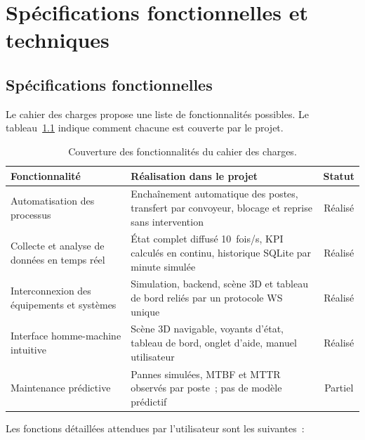 \chapter{Spécifications fonctionnelles et techniques}
\label{chap:specs}

\section{Spécifications fonctionnelles}

Le cahier des charges propose une liste de fonctionnalités possibles. Le tableau~\ref{tab:fonctionnel} indique comment chacune est couverte par le projet.

\begin{table}[H]
\centering
\caption{Couverture des fonctionnalités du cahier des charges.}
\label{tab:fonctionnel}
\begin{tabularx}{\textwidth}{@{}p{4.2cm} X c@{}}
\toprule
\textbf{Fonctionnalité} & \textbf{Réalisation dans le projet} & \textbf{Statut} \\
\midrule
Automatisation des processus & Enchaînement automatique des postes, transfert par convoyeur, blocage et reprise sans intervention & Réalisé \\
Collecte et analyse de données en temps réel & État complet diffusé 10~fois/s, \ac{KPI} calculés en continu, historique SQLite par minute simulée & Réalisé \\
Interconnexion des équipements et systèmes & Simulation, backend, scène \ac{3D} et tableau de bord reliés par un protocole \ac{WS} unique & Réalisé \\
Interface homme-machine intuitive & Scène \ac{3D} navigable, voyants d'état, tableau de bord, onglet d'aide, manuel utilisateur & Réalisé \\
Maintenance prédictive & Pannes simulées, \ac{MTBF} et \ac{MTTR} observés par poste~; pas de modèle prédictif & Partiel \\
\bottomrule
\end{tabularx}
\end{table}

Les fonctions détaillées attendues par l'utilisateur sont les suivantes~:

